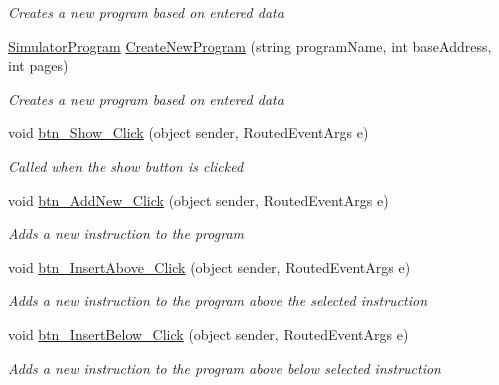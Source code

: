 \begin{DoxyCompactItemize}
\begin{DoxyCompactList}\small\item\em Creates a new program based on entered data \end{DoxyCompactList}\item 
\hyperlink{class_c_p_u___o_s___simulator_1_1_c_p_u_1_1_simulator_program}{Simulator\+Program} \hyperlink{class_c_p_u___o_s___simulator_1_1_main_window_aa735efa9bc97df2ceb545fdce5f351df}{Create\+New\+Program} (string program\+Name, int base\+Address, int pages)
\begin{DoxyCompactList}\small\item\em Creates a new program based on entered data \end{DoxyCompactList}\item 
void \hyperlink{class_c_p_u___o_s___simulator_1_1_main_window_afcb6e2b3719374f56fd8cb1c786bb219}{btn\+\_\+\+Show\+\_\+\+Click} (object sender, Routed\+Event\+Args e)
\begin{DoxyCompactList}\small\item\em Called when the show button is clicked \end{DoxyCompactList}\item 
void \hyperlink{class_c_p_u___o_s___simulator_1_1_main_window_a37c97ac2869b40063089f1af9cd86724}{btn\+\_\+\+Add\+New\+\_\+\+Click} (object sender, Routed\+Event\+Args e)
\begin{DoxyCompactList}\small\item\em Adds a new instruction to the program \end{DoxyCompactList}\item 
void \hyperlink{class_c_p_u___o_s___simulator_1_1_main_window_a8f710b1bee7b3c9360fb5652231b0502}{btn\+\_\+\+Insert\+Above\+\_\+\+Click} (object sender, Routed\+Event\+Args e)
\begin{DoxyCompactList}\small\item\em Adds a new instruction to the program above the selected instruction \end{DoxyCompactList}\item 
void \hyperlink{class_c_p_u___o_s___simulator_1_1_main_window_ac2307db4caedc82b5a6201077fb1c5b7}{btn\+\_\+\+Insert\+Below\+\_\+\+Click} (object sender, Routed\+Event\+Args e)
\begin{DoxyCompactList}\small\item\em Adds a new instruction to the program above below selected instruction \end{DoxyCompactList}\item 

\end{DoxyCompactItemize}
